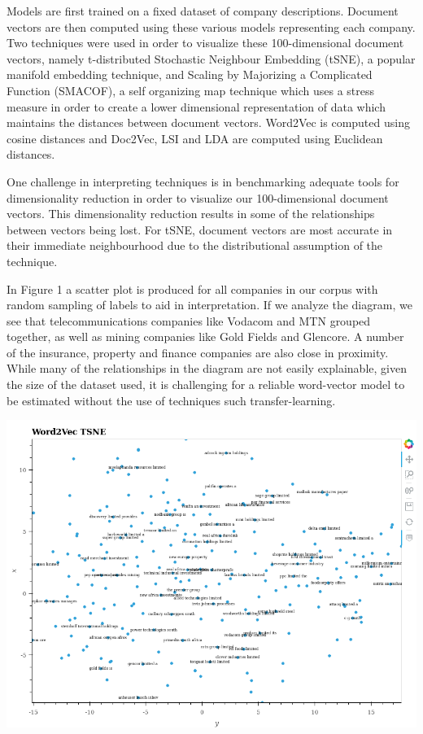 \documentclass[11pt]{article}
\makeatletter
\def\maxwidth{\ifdim\Gin@nat@width>\linewidth\linewidth
    \else\Gin@nat@width\fi}
\let\Oldincludegraphics\includegraphics
\renewcommand{\includegraphics}[1]{\Oldincludegraphics[width=.8\maxwidth]{#1}}
\makeatother
\begin{document}
Models are first trained on a fixed dataset of company descriptions.
Document vectors are then computed using these various models
representing each company. Two techniques were used in order to
visualize these 100-dimensional document vectors, namely t-distributed
Stochastic Neighbour Embedding (tSNE), a popular manifold embedding
technique, and Scaling by Majorizing a Complicated Function (SMACOF), a
self organizing map technique which uses a stress measure in order to
create a lower dimensional representation of data which maintains the
distances between document vectors. Word2Vec is computed using cosine
distances and Doc2Vec, LSI and LDA are computed using Euclidean
distances.

One challenge in interpreting techniques is in benchmarking adequate
tools for dimensionality reduction in order to visualize our
100-dimensional document vectors. This dimensionality reduction results
in some of the relationships between vectors being lost. For tSNE,
document vectors are most accurate in their immediate neighbourhood due
to the distributional assumption of the technique.

In Figure 1 a scatter plot is produced for all companies in our corpus
with random sampling of labels to aid in interpretation. If we analyze
the diagram, we see that telecommunications companies like Vodacom and
MTN grouped together, as well as mining companies like Gold Fields and
Glencore. A number of the insurance, property and finance companies are
also close in proximity. While many of the relationships in the diagram
are not easily explainable, given the size of the dataset used, it is
challenging for a reliable word-vector model to be estimated without the
use of techniques such transfer-learning.

\includegraphics{../experiments/media/Word2Vec TSNE.png}\\
\end{document}
